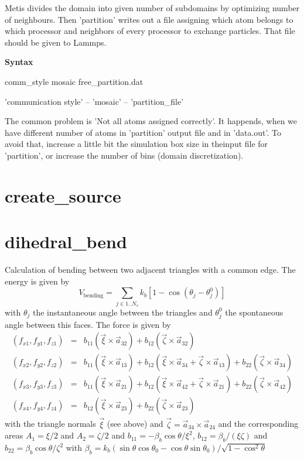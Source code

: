 Metis divides the domain into given number of subdomains by optimizing number of neighbours. Then 'partition' writes out a file assigning which atom belongs to which processor and neighbors of every processor to exchange particles. That file should be given to Lammps.

\textbf{Syntax}

comm\_style      mosaic free\_partition.dat

'communication style' -- 'mosaic' -- 'partition\_file'

The common problem is 'Not all atoms assigned correctly'. It happends, when we have different number of atoms in 'partition' output file and in 'data.out'. To avoid that, increase a little bit the simulation box size in theinput file for 'partition', or increase the number of bins (domain discretization).

\section{create\_source}

\section{dihedral\_bend}

Calculation of bending between two adjacent triangles with a common edge. The energy is given by
%
\begin{equation}
  V_\mathrm{bending} = \sum_{j\in1..N_s}k_b[1-\cos(\theta_j-\theta_j^0)]
\end{equation}
%
with $\theta_j$ the instantaneous angle between the triangles and  $\theta_j^0$ the spontaneous angle between this faces. The force is given by
%
\begin{align}
  (f_{x1}, f_{y1}, f_{z1}) &=& b_{11}(\vec{\xi}\times\vec{a}_{32})+b_{12}(\vec{\zeta}\times\vec{a}_{32}) \nonumber \\
(f_{x2}, f_{y2}, f_{z2}) &=& b_{11}(\vec{\xi}\times\vec{a}_{13})+b_{12}(\vec{\xi}\times\vec{a}_{34}+\vec{\zeta}\times\vec{a}_{13})+b_{22}(\vec{\zeta}\times\vec{a}_{34})\nonumber \\
(f_{x3}, f_{y3}, f_{z3}) &=& b_{11}(\vec{\xi}\times\vec{a}_{21})+b_{12}(\vec{\xi}\times\vec{a}_{42}+\vec{\zeta}\times\vec{a}_{21})+b_{22}(\vec{\zeta}\times\vec{a}_{42})\nonumber \\
(f_{x4}, f_{y4}, f_{z4}) &=& b_{12}(\vec{\xi}\times\vec{a}_{23})+b_{22}(\vec{\zeta}\times\vec{a}_{23})
\end{align}
%
with the triangle normals $\vec{\xi}$ (see above) and $\vec{\zeta}=\vec{a}_{34}\times\vec{a}_{24}$ and the corresponding areas $A_1=\xi/2$ and $A_2=\zeta/2$ and $b_{11}=-\beta_b\cos{\theta}/\xi^2$, $b_{12}=\beta_b/(\xi\zeta)$ and $b_{22}=\beta_b\cos{\theta}/\zeta^2$ with $\beta_b=k_b(\sin{\theta}\cos{\theta_0}-\cos{\theta}\sin{\theta_0})/\sqrt{1-\cos^2\theta}$\\

